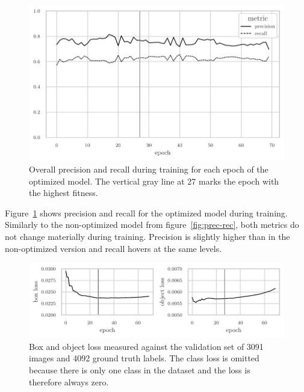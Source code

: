 \documentclass[final]{vutinfth} %
\begin{document}
\begin{figure}
  \centering
  \includegraphics{graphics/precision_recall_final.pdf}
  \caption[Hyperparameter optimized object detection precision and
  recall during training]{Overall precision and recall during training
    for each epoch of the optimized model. The vertical gray line at
    \num{27} marks the epoch with the highest fitness.}
  \label{fig:hyp-opt-prec-rec}
\end{figure}

Figure~\ref{fig:hyp-opt-prec-rec} shows precision and recall for the
optimized model during training. Similarly to the non-optimized model
from figure~\ref{fig:prec-rec}, both metrics do not change materially
during training. Precision is slightly higher than in the
non-optimized version and recall hovers at the same levels.

\begin{figure}
  \centering
  \includegraphics{graphics/val_box_obj_loss_final.pdf}
  \caption[Hyperparameter optimized object detection box and object
  loss]{Box and object loss measured against the validation set of
    \num{3091} images and \num{4092} ground truth labels. The class
    loss is omitted because there is only one class in the dataset and
    the loss is therefore always zero.}
  \label{fig:hyp-opt-box-obj-loss}
\end{figure}
\end{document}

